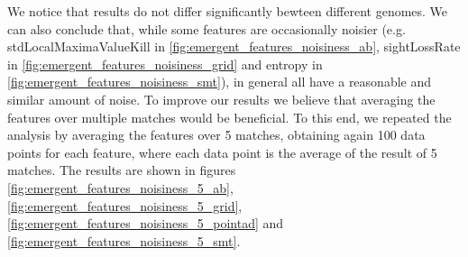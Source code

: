 \documentclass{Configuration_Files/PoliMi3i_thesis}
\begin{document}
\clearpage
We notice that results do not differ significantly bewteen different genomes. We can also conclude that, while some features are occasionally noisier (e.g. stdLocalMaximaValueKill in \ref{fig:emergent_features_noisiness_ab}, sightLossRate in \ref{fig:emergent_features_noisiness_grid} and entropy in \ref{fig:emergent_features_noisiness_smt}), in general all have a reasonable and similar amount of noise. To improve our results we believe that averaging the features over multiple matches would be beneficial. To this end, we repeated the analysis by averaging the features over 5 matches, obtaining again 100 data points for each feature, where each data point is the average of the result of 5 matches. The results are shown in figures \ref{fig:emergent_features_noisiness_5_ab}, \ref{fig:emergent_features_noisiness_5_grid}, \ref{fig:emergent_features_noisiness_5_pointad} and \ref{fig:emergent_features_noisiness_5_smt}.
\end{document}
